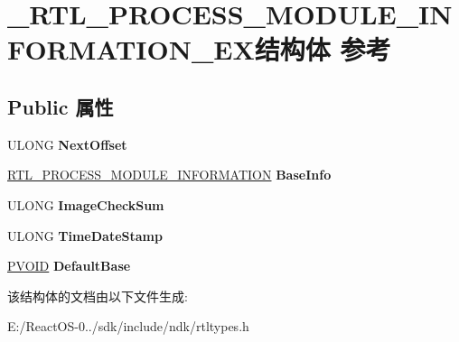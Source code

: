 \hypertarget{struct___r_t_l___p_r_o_c_e_s_s___m_o_d_u_l_e___i_n_f_o_r_m_a_t_i_o_n___e_x}{}\section{\+\_\+\+R\+T\+L\+\_\+\+P\+R\+O\+C\+E\+S\+S\+\_\+\+M\+O\+D\+U\+L\+E\+\_\+\+I\+N\+F\+O\+R\+M\+A\+T\+I\+O\+N\+\_\+\+E\+X结构体 参考}
\label{struct___r_t_l___p_r_o_c_e_s_s___m_o_d_u_l_e___i_n_f_o_r_m_a_t_i_o_n___e_x}
\subsection*{Public 属性}
\begin{DoxyCompactItemize}
\item 
\mbox{\label{struct___r_t_l___p_r_o_c_e_s_s___m_o_d_u_l_e___i_n_f_o_r_m_a_t_i_o_n___e_x_add8e73e2993db4ed13745ad6d1cac21b}} 
U\+L\+O\+NG {\bfseries Next\+Offset}
\item 
\mbox{\label{struct___r_t_l___p_r_o_c_e_s_s___m_o_d_u_l_e___i_n_f_o_r_m_a_t_i_o_n___e_x_a2f63efe8593f7ea0140b4383144ac7dc}} 
\hyperlink{struct___r_t_l___p_r_o_c_e_s_s___m_o_d_u_l_e___i_n_f_o_r_m_a_t_i_o_n}{R\+T\+L\+\_\+\+P\+R\+O\+C\+E\+S\+S\+\_\+\+M\+O\+D\+U\+L\+E\+\_\+\+I\+N\+F\+O\+R\+M\+A\+T\+I\+ON} {\bfseries Base\+Info}
\item 
\mbox{\label{struct___r_t_l___p_r_o_c_e_s_s___m_o_d_u_l_e___i_n_f_o_r_m_a_t_i_o_n___e_x_ac9bebdb773922259357c69e1125ca77e}} 
U\+L\+O\+NG {\bfseries Image\+Check\+Sum}
\item 
\mbox{\label{struct___r_t_l___p_r_o_c_e_s_s___m_o_d_u_l_e___i_n_f_o_r_m_a_t_i_o_n___e_x_aa4fe6e47ca3e58173ecc7027a50ee5e4}} 
U\+L\+O\+NG {\bfseries Time\+Date\+Stamp}
\item 
\mbox{\label{struct___r_t_l___p_r_o_c_e_s_s___m_o_d_u_l_e___i_n_f_o_r_m_a_t_i_o_n___e_x_a17a330748c62f22e815cd23d4538fc46}} 
\hyperlink{interfacevoid}{P\+V\+O\+ID} {\bfseries Default\+Base}
\end{DoxyCompactItemize}


该结构体的文档由以下文件生成\+:\begin{DoxyCompactItemize}
\item 
E\+:/\+React\+O\+S-\/0../sdk/include/ndk/rtltypes.\+h\end{DoxyCompactItemize}

